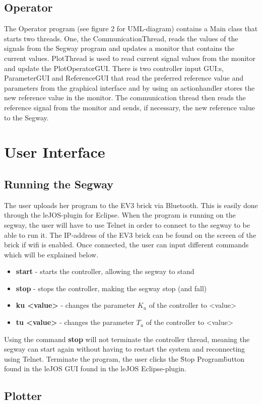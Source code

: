 \subsection{Operator}
The Operator program (see figure 2 for UML-diagram)  contains a Main class that starts two threads. One, the CommunicationThread, reads the values of the signals from the Segway program and updates a monitor that contains the current values. PlotThread is used to read current signal values from the monitor and update the PlotOperatorGUI. There is two controller input GUI:s, ParameterGUI and ReferenceGUI that read the preferred reference value and parameters from the graphical interface and by using an actionhandler stores the new reference value in the monitor. The communication thread then reads the reference signal from the monitor and sends, if necessary, the new reference value to the Segway.

\section{User Interface}

\subsection{Running the Segway}
The user uploads her program to the EV3 brick via Bluetooth. This is easily done through the leJOS-plugin for Eclipse. When the program is running on the segway, the user will have to use Telnet in order to connect to the segway to be able to run it. The IP-address of the EV3 brick can be found on the screen of the brick if wifi is enabled. Once connected, the user can input different commands which will be explained below.

\begin{itemize}
\item \textbf{start} - starts the controller, allowing the segway to stand
\item \textbf{stop} - stops the controller, making the segway stop (and fall)
\item \textbf{ku <value>} - changes the parameter $K_{u}$ of the controller to <value>
\item \textbf{tu <value>} - changes the parameter $T_{u}$ of the controller to <value>
\end{itemize}

\noindent Using the command \textbf{stop} will not terminate the controller thread, meaning the segway can start again without having to restart the system and reconnecting using Telnet. Terminate the program, the user clicks the \"Stop Program\" button found in the leJOS GUI found in the leJOS Eclipse-plugin.

\subsection{Plotter}


